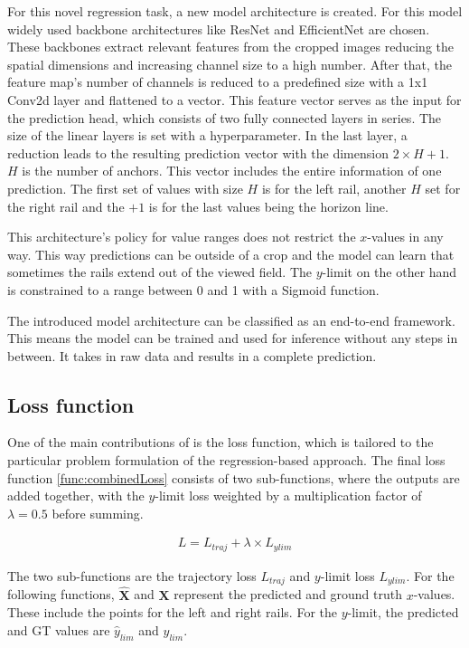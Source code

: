 For this novel regression task, a new model architecture is created.
For this model widely used backbone architectures like ResNet and EfficientNet are chosen.
These backbones extract relevant features from the cropped images reducing the spatial dimensions and increasing channel size to a high number.
After that, the feature map's number of channels is reduced to a predefined size with a 1x1 Conv2d layer \cite{pytorch_conv2d_docu} and flattened to a vector.
This feature vector serves as the input for the prediction head, which consists of two fully connected layers \cite{pytorch_linearLayer_docu} in series.
The size of the linear layers is set with a hyperparameter.
In the last layer, a reduction leads to the resulting prediction vector with the dimension $2 \times H + 1$.
$H$ is the number of anchors.
This vector includes the entire information of one prediction.
The first set of values with size $H$ is for the left rail, another $H$ set for the right rail and the $+ 1$ is for the last values being the horizon line.

This architecture's policy for value ranges does not restrict the $x$-values in any way.
This way predictions can be outside of a crop and the model can learn that sometimes the rails extend out of the viewed field.
The $y$-limit on the other hand is constrained to a range between 0 and 1 with a Sigmoid function.

The introduced model architecture can be classified as an end-to-end framework.
This means the model can be trained and used for inference without any steps in between.
It takes in raw data and results in a complete prediction.

\subsection{Loss function}

One of the main contributions of \cite{tepNet2024} is the loss function, which is tailored to the particular problem formulation of the regression-based approach.
The final loss function \autoref{func:combinedLoss} \cite{tepNet2024} consists of two sub-functions, where the outputs are added together, with the $y$-limit loss weighted by a multiplication factor of $\lambda=0.5$ before summing.

\begin{align}
    L = L_{traj} + \lambda \times L_{ylim}
    \label{func:combinedLoss}
\end{align}

The two sub-functions are the trajectory loss $L_{traj}$ and $y$-limit loss $L_{ylim}$.
For the following functions, $\hat{\mathbf{X}}$ and $\mathbf{X}$ represent the predicted and ground truth $x$-values.
These include the points for the left and right rails.
For the $y$-limit, the predicted and \ac{GT} values are $\hat{y}_{lim}$ and $y_{lim}$.

